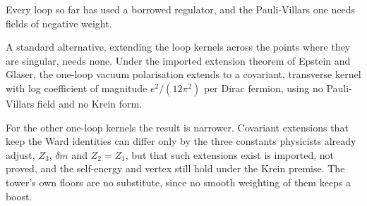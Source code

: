 \documentclass[11pt]{article}
\theoremstyle{definition}
\theoremstyle{plain}
\begin{document}
Every loop so far has used a borrowed regulator, and the Pauli-Villars one needs fields of negative weight.

A standard alternative, extending the loop kernels across the points where they are singular, needs none. Under the imported extension theorem of Epstein and Glaser, the one-loop vacuum polarisation extends to a covariant, transverse kernel with log coefficient of magnitude $e^{2}/(12\pi^{2})$ per Dirac fermion, using no Pauli-Villars field and no Krein form.

For the other one-loop kernels the result is narrower. Covariant extensions that keep the Ward identities can differ only by the three constants physicists already adjust, $Z_{3}$, $\delta m$ and $Z_{2} = Z_{1}$, but that such extensions exist is imported, not proved, and the self-energy and vertex still hold under the Krein premise. The tower's own floors are no substitute, since no smooth weighting of them keeps a boost.
\end{document}
